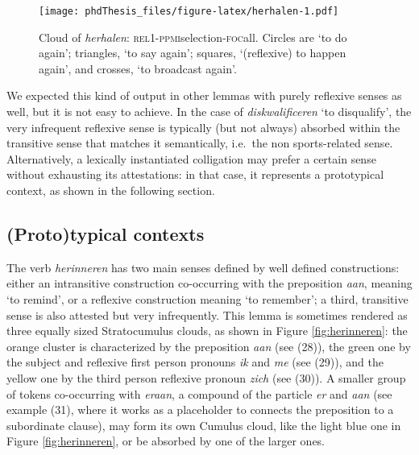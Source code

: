 \documentclass[
]{book}
\begin{document}
\begin{figure}
\centering
\texttt{[image: phdThesis\_files/figure-latex/herhalen-1.pdf]}
\caption{\label{fig:herhalen}Cloud of \emph{herhalen}: \textsc{rel}1-\textsc{ppmi}selection-\textsc{foc}all. Circles are `to do again'; triangles, `to say again'; squares, `(reflexive) to happen again', and crosses, `to broadcast again'.}
\end{figure}

We expected this kind of output in other lemmas with purely reflexive senses as well, but it is not easy to achieve. In the case of \emph{diskwalificeren} `to disqualify', the very infrequent reflexive sense is typically (but not always) absorbed within the transitive sense that matches it semantically, i.e.~the non sports-related sense.
Alternatively, a lexically instantiated colligation may prefer a certain sense without exhausting its attestations: in that case, it represents a prototypical context, as shown in the following section.

\hypertarget{prototypical-contexts}{%
\subsection{(Proto)typical contexts}\label{prototypical-contexts}}

The verb \emph{herinneren} has two main senses defined by well defined constructions: either an intransitive construction co-occurring with the preposition \emph{aan}, meaning `to remind', or a reflexive construction meaning `to remember'; a third, transitive sense is also attested but very infrequently.
This lemma is sometimes rendered as three equally sized Stratocumulus clouds, as shown in Figure \ref{fig:herinneren}: the orange cluster is characterized by the preposition \emph{aan} (see (28)), the green one by the subject and reflexive first person pronouns \emph{ik} and \emph{me} (see (29)), and the yellow one by the third person reflexive pronoun \emph{zich} (see (30)). A smaller group of tokens co-occurring with \emph{eraan}, a compound of the particle \emph{er} and \emph{aan} (see example (31), where it works as a placeholder to connects the preposition to a subordinate clause), may form its own Cumulus cloud, like the light blue one in Figure \ref{fig:herinneren}, or be absorbed by one of the larger ones.
\end{document}
